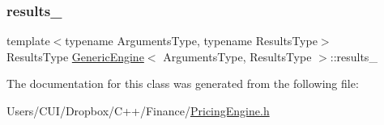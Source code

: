 \subsubsection{\texorpdfstring{results\+\_\+}{results\_}}
{\footnotesize\ttfamily template$<$typename Arguments\+Type, typename Results\+Type$>$ \\
Results\+Type \hyperlink{class_generic_engine}{Generic\+Engine}$<$ Arguments\+Type, Results\+Type $>$\+::results\+\_\+\hspace{0.3cm}{\ttfamily [mutable]}}



The documentation for this class was generated from the following file\+:\begin{DoxyCompactItemize}
\item 
Users/\+C\+U\+I/\+Dropbox/\+C++/\+Finance/\hyperlink{_pricing_engine_8h}{Pricing\+Engine.\+h}\end{DoxyCompactItemize}
